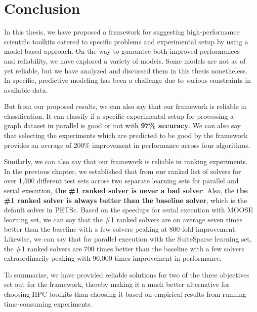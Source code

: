 \chapter{Conclusion} \label{conclusion}
In this thesis, we have proposed a framework for suggesting high-performance scientific toolkits catered to specific problems and experimental setup by using a model-based approach. On the way to guarantee both improved performances and reliability, we have explored a variety of models. Some models are not as of yet reliable, but we have analyzed and discussed them in this thesis nonetheless. In specific, predictive modeling has been a challenge due to various constraints in available data. 
 
 But from our proposed results, we can also say that our framework is reliable in classification. It can classify if a specific experimental setup for processing a graph dataset in parallel is good or not with \textbf{97\% accuracy}. We can also say that selecting the experiments which are predicted to be good by the framework provides an average of 200\% improvement in performance across four algorithms.    
 
 Similarly, we can also say that our framework is reliable in ranking experiments. In the previous chapter, we established that from our ranked list of solvers for over 1,500 different test sets across two separate learning sets for parallel and serial execution, \textbf{the \#1 ranked solver is never a bad solver}. Also, the \textbf{the \#1 ranked solver is always better than the baseline solver}, which is the default solver in PETSc. Based on the speedups for serial execution with MOOSE learning set, we can say that the \#1 ranked solvers are on average seven times better than the baseline with a few solvers peaking at 800-fold improvement. Likewise, we can say that for parallel execution with the SuiteSparse learning set, the \#1 ranked solvers are 700 times better than the baseline with a few solvers extraordinarily peaking with 90,000 times improvement in performance.
 
 To summarize, we have provided reliable solutions for two of the three objectives set out for the framework, thereby making it a much better alternative for choosing HPC toolkits than choosing it based on empirical results from running time-consuming experiments. 

